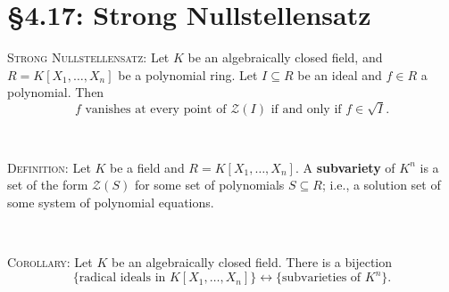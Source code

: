 \documentclass[12pt]{amsart}
\newcommand{\1}{\mathbbm{1}}
\newcommand{\cZ}{\mathcal{Z}}
\newcommand{\showsol}[1]{\def\displaysol{#1}}
\begin{document}
\showsol{0}
	
	\thispagestyle{empty}
	
	\section*{\S4.17: Strong Nullstellensatz}	

\begin{framed}
\noindent \textsc{Strong Nullstellensatz:} Let $K$ be an algebraically closed field, and $R=K[X_1,\dots,X_n]$ be a polynomial ring. Let $I\subseteq R$ be an ideal and $f\in R$ a polynomial. Then \[ \text{$f$ vanishes at every point of $\cZ(I)$ if and only if $f\in \sqrt{I}$.}\] 

\


\noindent \textsc{Definition:} Let $K$ be a field and $R=K[X_1,\dots,X_n]$. A \textbf{subvariety} of $K^n$ is a set of the form $\cZ(S)$ for some set of polynomials $S\subseteq R$; i.e., a solution set of some system of polynomial equations.

\

\noindent \textsc{Corollary:} Let $K$ be an algebraically closed field. There is a bijection
\[ \{ \text{radical ideals in $K[X_1,\dots,X_n]$}\}  \longleftrightarrow \{ \text{subvarieties of $K^n$}\}.\]
\end{framed}
\end{document}
